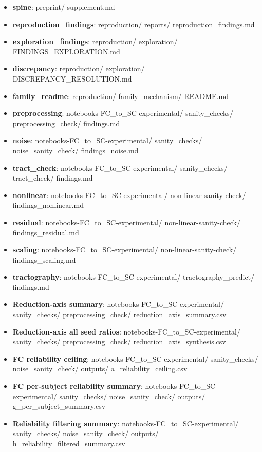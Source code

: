 \begin{itemize}
\tightlist
\item
  \textbf{spine}: preprint/ supplement.md
\item
  \textbf{reproduction\_findings}: reproduction/ reports/ reproduction\_findings.md
\item
  \textbf{exploration\_findings}: reproduction/ exploration/ FINDINGS\_EXPLORATION.md
\item
  \textbf{discrepancy}: reproduction/ exploration/ DISCREPANCY\_RESOLUTION.md
\item
  \textbf{family\_readme}: reproduction/ family\_mechanism/ README.md
\item
  \textbf{preprocessing}: notebooks-FC\_to\_SC-experimental/ sanity\_checks/ preprocessing\_check/ findings.md
\item
  \textbf{noise}: notebooks-FC\_to\_SC-experimental/ sanity\_checks/ noise\_sanity\_check/ findings\_noise.md
\item
  \textbf{tract\_check}: notebooks-FC\_to\_SC-experimental/ sanity\_checks/ tract\_check/ findings.md
\item
  \textbf{nonlinear}: notebooks-FC\_to\_SC-experimental/ non-linear-sanity-check/ findings\_nonlinear.md
\item
  \textbf{residual}: notebooks-FC\_to\_SC-experimental/ non-linear-sanity-check/ findings\_residual.md
\item
  \textbf{scaling}: notebooks-FC\_to\_SC-experimental/ non-linear-sanity-check/ findings\_scaling.md
\item
  \textbf{tractography}: notebooks-FC\_to\_SC-experimental/ tractography\_predict/ findings.md
\item
  \textbf{Reduction-axis summary}: notebooks-FC\_to\_SC-experimental/ sanity\_checks/ preprocessing\_check/ reduction\_axis\_summary.csv
\item
  \textbf{Reduction-axis all seed ratios}: notebooks-FC\_to\_SC-experimental/ sanity\_checks/ preprocessing\_check/ reduction\_axis\_synthesis.csv
\item
  \textbf{FC reliability ceiling}: notebooks-FC\_to\_SC-experimental/ sanity\_checks/ noise\_sanity\_check/ outputs/ a\_reliability\_ceiling.csv
\item
  \textbf{FC per-subject reliability summary}: notebooks-FC\_to\_SC-experimental/ sanity\_checks/ noise\_sanity\_check/ outputs/ g\_per\_subject\_summary.csv
\item
  \textbf{Reliability filtering summary}: notebooks-FC\_to\_SC-experimental/ sanity\_checks/ noise\_sanity\_check/ outputs/ h\_reliability\_filtered\_summary.csv

\end{itemize}
